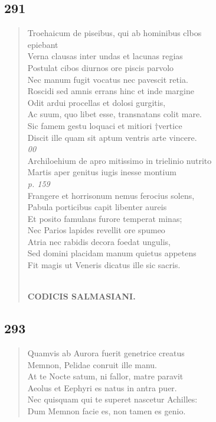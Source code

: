 \documentclass[11pt, a4paper]{report}
\begin{document}
            \subsection*{291}
      \begin{verse}
      Troehaicum de piseibus, qui ab hominibus clbos \\ epiebant \\ Verna clausas inter undas et lacunas regias \\ Postulat cibos diurnos ore piscis parvolo \\ Nec manum fugit vocatus nec pavescit retia. \\ Roscidi sed amnis errans hinc et inde margine \\ Odit ardui procellas et dolosi gurgitis, \\ Ac suum, quo libet esse, transnatans colit mare. \\ Sic famem gestu loquaci et mitiori †vertice \\ Discit ille quam sit aptum ventris arte vincere. \\ \textit{00} \\ Archiloehium de apro mitissimo in trielinio nutrito \\ Martis aper genitus iugis inesse montium \\ \textit{p. 159} \\ Frangere  \lbrack et \rbrack  horrisonum nemus ferocius solens, \\ Pabula porticibus capit libenter aureis \\ Et posito famulans furore temperat minas; \\ Nec Parios lapides revellit ore spumeo \\ Atria nec rabidis decora foedat ungulis, \\ Sed domini placidam manum quietus appetens \\ Fit magis ut Veneris dicatus ille sic sacris. \\ 
        ﻿\pagebreak 
    \begin{center} \textbf{CODICIS SALMASIANI.} \end{center} \marginpar{[01]} 
      \end{verse}
  
            \subsection*{293}
      \begin{verse}
      Quamvis ab Aurora fuerit genetrice creatus \\ Memnon, Pelidae conruit ille manu. \\ At te Nocte satum, ni fallor, matre paravit \\ Aeolus et Eephyri es natus in antra puer. \\ Nec quisquam qui te superet nascetur Achilles: \\ Dum Memnon facie es, non tamen es genio. \\ 
      \end{verse}
  
\end{document}
